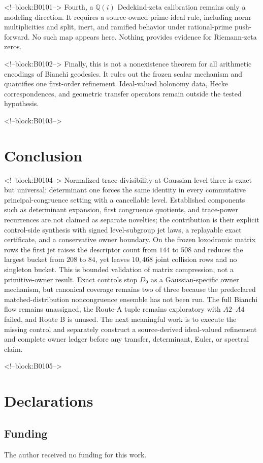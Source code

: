 \documentclass[11pt,a4paper]{article}
\theoremstyle{definition}
\theoremstyle{remark}
\begin{document}
<!--block:B0101-->
Fourth, a \(\mathbb Q(i)\) Dedekind-zeta calibration remains only a modeling direction. It requires a source-owned prime-ideal rule, including norm multiplicities and split, inert, and ramified behavior under rational-prime push-forward. No such map appears here. Nothing provides evidence for Riemann-zeta zeros.

<!--block:B0102-->
Finally, this is not a nonexistence theorem for all arithmetic encodings of Bianchi geodesics. It rules out the frozen scalar mechanism and quantifies one first-order refinement. Ideal-valued holonomy data, Hecke correspondences, and geometric transfer operators remain outside the tested hypothesis.

<!--block:B0103-->
\section{Conclusion}

<!--block:B0104-->
Normalized trace divisibility at Gaussian level three is exact but universal: determinant one forces the same identity in every commutative principal-congruence setting with a cancellable level. Established components such as determinant expansion, first congruence quotients, and trace-power recurrences are not claimed as separate novelties; the contribution is their explicit control-side synthesis with signed level-subgroup jet laws, a replayable exact certificate, and a conservative owner boundary. On the frozen loxodromic matrix rows the first jet raises the descriptor count from \(144\) to \(508\) and reduces the largest bucket from \(208\) to \(84\), yet leaves \(10{,}468\) joint collision rows and no singleton bucket. This is bounded validation of matrix compression, not a primitive-owner result. Exact controls stop \(D_9\) as a Gaussian-specific owner mechanism, but canonical coverage remains two of three because the predeclared matched-distribution noncongruence ensemble has not been run. The full Bianchi flow remains unassigned, the Route-A tuple remains exploratory with \(A2\)--\(A4\) failed, and Route B is unused. The next meaningful work is to execute the missing control and separately construct a source-derived ideal-valued refinement and complete owner ledger before any transfer, determinant, Euler, or spectral claim.

<!--block:B0105-->
\section*{Declarations}
\subsection*{Funding}
The author received no funding for this work.
\end{document}
